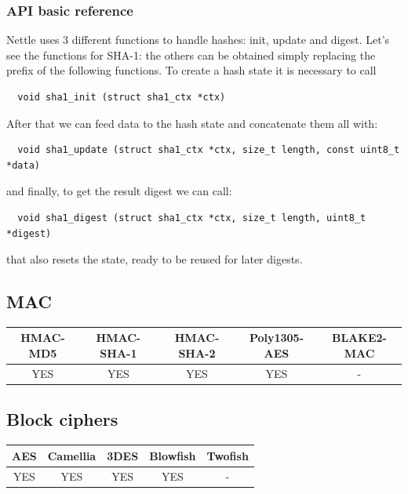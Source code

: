 \subsubsection*{API basic reference}
Nettle uses 3 different functions to handle hashes: init, update and digest. Let's see the functions for SHA-1: the others can be obtained simply replacing the prefix of the following functions. To create a hash state it is necessary to call
\begin{verbatim}
  void sha1_init (struct sha1_ctx *ctx)
\end{verbatim}
After that we can feed data to the hash state and concatenate them all with:
\begin{verbatim}
  void sha1_update (struct sha1_ctx *ctx, size_t length, const uint8_t *data)
\end{verbatim}
and finally, to get the result digest we can call:
\begin{verbatim}
  void sha1_digest (struct sha1_ctx *ctx, size_t length, uint8_t *digest)
\end{verbatim}
that also resets the state, ready to be reused for later digests.
\newpage

\subsection{MAC}
\begin{table}[!ht]
	\begin{tabular}{|| c | c | c | c | c ||}
		\textbf{HMAC-MD5} & \textbf{HMAC-SHA-1} & \textbf{HMAC-SHA-2} & \textbf{Poly1305-AES} & \textbf{BLAKE2-MAC} \\
		\hline \hline
		YES & YES & YES & YES & - \\
	\end{tabular}
\end{table}

\subsection{Block ciphers}
\begin{table}[!h]
	\begin{tabular}{|| c | c | c | c | c ||}
		\textbf{AES} & \textbf{Camellia} & \textbf{3DES} & \textbf{Blowfish} & \textbf{Twofish} \\
		\hline \hline
		YES & YES & YES & YES & - \\
	\end{tabular}
\end{table}
